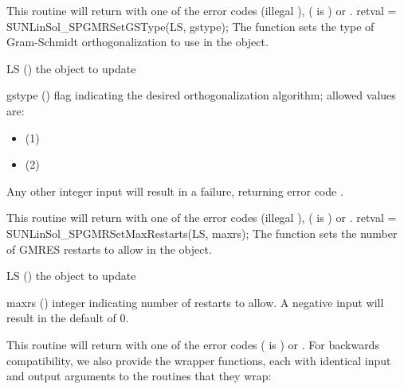{
  This routine will return with one of the error codes
   (illegal ), 
  ( is ) or .
}
{
}
{
  retval = SUNLinSol\_SPGMRSetGSType(LS, gstype);
}
{
  The function  sets the type of
  Gram-Schmidt orthogonalization to use in the {\sunlinsolspgmr}
  object. 
}
{
  \begin{args}[gstype]
  \item[LS] ()
    the {\sunlinsolspgmr} object to update
  \item[gstype] ()
    flag indicating the desired orthogonalization algorithm; allowed 
    values are:
    \begin{itemize}
    \item {} (1)
    \item {} (2)
    \end{itemize}
    Any other integer input will result in a
    failure, returning error code .
  \end{args}
}
{
  This routine will return with one of the error codes
   (illegal ), 
  ( is ) or .
}
{
}
{
  retval = SUNLinSol\_SPGMRSetMaxRestarts(LS, maxrs);
}
{
  The function  sets the number of
  GMRES restarts to allow in the {\sunlinsolspgmr} object. 
}
{
  \begin{args}[maxrs]
  \item[LS] ()
    the {\sunlinsolspgmr} object to update
  \item[maxrs] ()
    integer indicating number of restarts to allow.  A negative input
    will result in the default of 0. 
  \end{args}
}
{
  This routine will return with one of the error codes
   ( is ) or .
}
{
}
For backwards compatibility, we also provide the wrapper functions,
each with identical input and output arguments to the routines that
they wrap:
